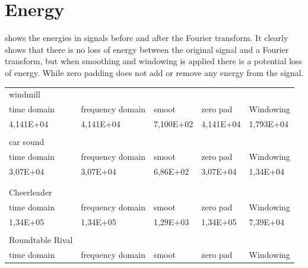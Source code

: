 \section{Energy} 
 shows the energies in signals before and after the Fourier transform. It clearly shows that there is no loss of energy between the original signal and a Fourier transform, but when smoothing and windowing is applied there is a potential loss of energy.
While zero padding does not add or remove any energy from the signal.
\begin{table}[]
	\centering
	\begin{tabularx}{\textwidth}{Xllll}
		windmill                      &                  &           &           &           \\
		time domain                   & frequency domain & smoot     & zero pad  & Windowing \\
		4,141E+04                     & 4,141E+04        & 7,100E+02 & 4,141E+04 & 1,793E+04 \\
		                              &                  &           &           &           \\
		car sound                     &                  &           &           &           \\
		time domain                   & frequency domain & smoot     & zero pad  & Windowing \\
		3,07E+04                      & 3,07E+04         & 6,86E+02  & 3,07E+04  & 1,34E+04  \\
		                              &                  &           &           &           \\
		                              &                  &           &           &           \\
		Cheerleader                   &                  &           &           &           \\
		time domain                   & frequency domain & smoot     & zero pad  & Windowing \\
		1,34E+05                      & 1,34E+05         & 1,29E+03  & 1,34E+05  & 7,39E+04  \\
		                              &                  &           &           &           \\
		Roundtable Rival              &                  &           &           &           \\
		time domain                   & frequency domain & smoot     & zero pad  & Windowing \\

\end{tabularx}
\end{table}
